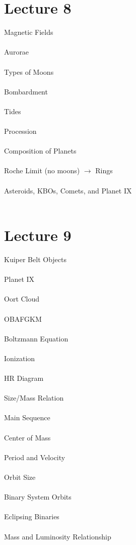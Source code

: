 \documentclass[11pt,reqno]{article}
\theoremstyle{definition}
\begin{document}
\section*{Lecture 8}
Magnetic Fields\\\\
Aurorae\\\\
Types of Moons\\\\
Bombardment\\\\
Tides\\\\
Procession\\\\
Composition of Planets\\\\
Roche Limit (no moons) $\rightarrow$ Rings\\\\
Asteroids, KBOs, Comets, and Planet IX\\\\

\section*{Lecture 9}
Kuiper Belt Objects\\\\
Planet IX\\\\
Oort Cloud\\\\
OBAFGKM\\\\
Boltzmann Equation\\\\
Ionization\\\\
HR Diagram\\\\
Size/Mass Relation\\\\
Main Sequence\\\\
Center of Mass\\\\
Period and Velocity\\\\
Orbit Size\\\\
Binary System Orbits\\\\
Eclipsing Binaries\\\\
Mass and Luminosity Relationship\\\\
\end{document}
